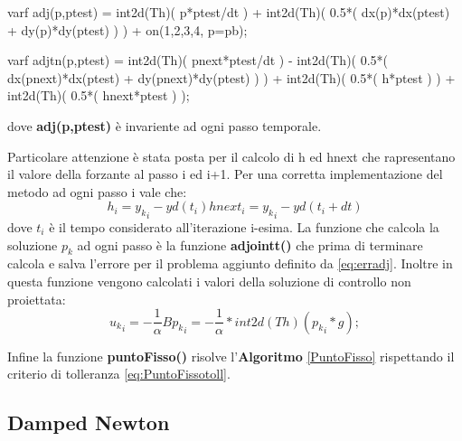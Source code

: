 \begin{Code}[caption={Matrici \texttt{adj(w,wtest)} e \texttt{adjtn(w,wtest)}}]
varf adj(p,ptest) =   int2d(Th)( p*ptest/dt )			
					+ int2d(Th)( 0.5*( dx(p)*dx(ptest) + dy(p)*dy(ptest) ) ) 
				    + on(1,2,3,4, p=pb);

varf adjtn(p,ptest) =   int2d(Th)( pnext*ptest/dt )
    				  - int2d(Th)( 0.5*( dx(pnext)*dx(ptest) + dy(pnext)*dy(ptest) ) ) 
  					  + int2d(Th)( 0.5*( h*ptest ) ) 
  					  + int2d(Th)( 0.5*( hnext*ptest ) ); 
\end{Code}
dove \textbf{adj(p,ptest)} è invariente ad ogni passo temporale.
\par
Particolare attenzione è stata posta per il calcolo di h ed hnext che rapresentano il valore della forzante al passo i ed i+1. Per una corretta implementazione del metodo ad ogni passo i vale che:
\begin{equation}
h_i = {y_k}_i - yd(t_i)
hnext_i = {y_k}_i - yd(t_i+dt)
\label{hhnext}
\end{equation}
dove $t_i$ è il tempo considerato all'iterazione i-esima.
La funzione che calcola la soluzione $p_k$ ad ogni passo è la funzione \textbf{adjointt()} che prima di terminare calcola e salva l'errore per il problema aggiunto definito da \eqref{eq:erradj}. Inoltre in questa funzione vengono calcolati i valori della soluzione di controllo non proiettata:
\begin{equation}
{u_k}_i = -\frac{1}{\alpha}B{p_k}_i  = -\frac{1}{\alpha}*int2d(Th)( {p_k}_i * g ); 
\label{unp}
\end{equation}
\par
Infine la funzione \textbf{puntoFisso()} risolve l'\textbf{Algoritmo} \ref{PuntoFisso} rispettando il criterio di tolleranza \eqref{eq:PuntoFissotoll}.

\subsection{Damped Newton}